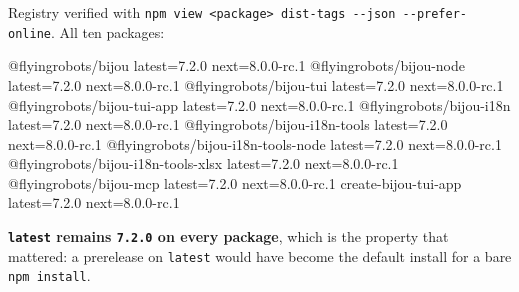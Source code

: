 

Registry verified with \texttt{n\allowbreak{}p\allowbreak{}m\allowbreak{} \allowbreak{}v\allowbreak{}i\allowbreak{}e\allowbreak{}w\allowbreak{} \allowbreak{}<\allowbreak{}p\allowbreak{}a\allowbreak{}c\allowbreak{}k\allowbreak{}a\allowbreak{}g\allowbreak{}e\allowbreak{}>\allowbreak{} \allowbreak{}d\allowbreak{}i\allowbreak{}s\allowbreak{}t\allowbreak{}-\allowbreak{}t\allowbreak{}a\allowbreak{}g\allowbreak{}s\allowbreak{} \allowbreak{}-\allowbreak{}-\allowbreak{}j\allowbreak{}s\allowbreak{}o\allowbreak{}n\allowbreak{} \allowbreak{}-\allowbreak{}-\allowbreak{}p\allowbreak{}r\allowbreak{}e\allowbreak{}f\allowbreak{}e\allowbreak{}r\allowbreak{}-\allowbreak{}o\allowbreak{}n\allowbreak{}l\allowbreak{}i\allowbreak{}n\allowbreak{}e}. All ten packages:

\begin{CodeBlock}
@flyingrobots/bijou                   latest=7.2.0  next=8.0.0-rc.1
@flyingrobots/bijou-node              latest=7.2.0  next=8.0.0-rc.1
@flyingrobots/bijou-tui               latest=7.2.0  next=8.0.0-rc.1
@flyingrobots/bijou-tui-app           latest=7.2.0  next=8.0.0-rc.1
@flyingrobots/bijou-i18n              latest=7.2.0  next=8.0.0-rc.1
@flyingrobots/bijou-i18n-tools        latest=7.2.0  next=8.0.0-rc.1
@flyingrobots/bijou-i18n-tools-node   latest=7.2.0  next=8.0.0-rc.1
@flyingrobots/bijou-i18n-tools-xlsx   latest=7.2.0  next=8.0.0-rc.1
@flyingrobots/bijou-mcp               latest=7.2.0  next=8.0.0-rc.1
create-bijou-tui-app                  latest=7.2.0  next=8.0.0-rc.1
\end{CodeBlock}

\textbf{\texttt{l\allowbreak{}a\allowbreak{}t\allowbreak{}e\allowbreak{}s\allowbreak{}t} remains \texttt{7\allowbreak{}.\allowbreak{}2\allowbreak{}.\allowbreak{}0} on every package}, which is the property that mattered: a prerelease on \texttt{l\allowbreak{}a\allowbreak{}t\allowbreak{}e\allowbreak{}s\allowbreak{}t} would have become the default install for a bare \texttt{n\allowbreak{}p\allowbreak{}m\allowbreak{} \allowbreak{}i\allowbreak{}n\allowbreak{}s\allowbreak{}t\allowbreak{}a\allowbreak{}l\allowbreak{}l}.

